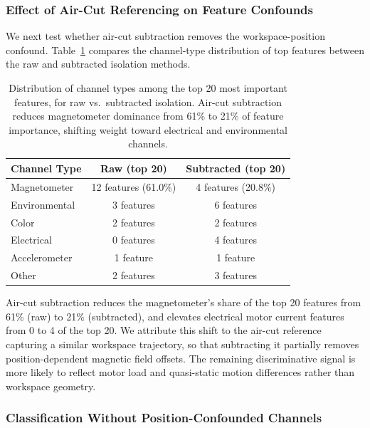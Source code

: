 \subsubsection{Effect of Air-Cut Referencing on Feature Confounds}

We next test whether air-cut subtraction removes the workspace-position confound. Table~\ref{tab:confound_removal} compares the channel-type distribution of top features between the raw and subtracted isolation methods.

\begin{table}[H]
\caption{Distribution of channel types among the top 20 most important features, for raw vs.\ subtracted isolation. Air-cut subtraction reduces magnetometer dominance from 61\% to 21\% of feature importance, shifting weight toward electrical and environmental channels.}\label{tab:confound_removal}
\centering
\begin{tabular}{lcc}
\toprule
\textbf{Channel Type} & \textbf{Raw (top 20)} & \textbf{Subtracted (top 20)} \\
\midrule
Magnetometer     & 12 features (61.0\%) & 4 features (20.8\%) \\
Environmental    & 3 features           & 6 features \\
Color            & 2 features           & 2 features \\
Electrical       & 0 features           & 4 features \\
Accelerometer    & 1 feature            & 1 feature \\
Other            & 2 features           & 3 features \\
\bottomrule
\end{tabular}
\end{table}

Air-cut subtraction reduces the magnetometer's share of the top 20 features from 61\% (raw) to 21\% (subtracted), and elevates electrical motor current features from 0 to 4 of the top 20. We attribute this shift to the air-cut reference capturing a similar workspace trajectory, so that subtracting it partially removes position-dependent magnetic field offsets. The remaining discriminative signal is more likely to reflect motor load and quasi-static motion differences rather than workspace geometry.

\subsubsection{Classification Without Position-Confounded Channels}

